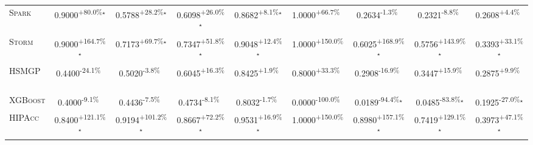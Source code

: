 \begin{table}[htbp]
\begin{tabular}{l|cccc|cccc}
\textsc{Spark} & \cellcolor{green!30}0.9000\textsuperscript{+80.0\%}$^\star$ & \cellcolor{green!30}0.5788\textsuperscript{+28.2\%}$^\star$ & \cellcolor{green!30}0.6098\textsuperscript{+26.0\%}$^\star$ & \cellcolor{green!30}0.8682\textsuperscript{+8.1\%}$^\star$ & \cellcolor{green!30}1.0000\textsuperscript{+66.7\%}$^{\,\,\,}$ & \cellcolor{red!30}0.2634\textsuperscript{-1.3\%}$^{\,\,\,}$ & \cellcolor{red!30}0.2321\textsuperscript{-8.8\%}$^{\,\,\,}$ & \cellcolor{green!30}0.2608\textsuperscript{+4.4\%}$^{\,\,\,}$ \\
\textsc{Storm} & \cellcolor{green!30}0.9000\textsuperscript{+164.7\%}$^\star$ & \cellcolor{green!30}0.7173\textsuperscript{+69.7\%}$^\star$ & \cellcolor{green!30}0.7347\textsuperscript{+51.8\%}$^\star$ & \cellcolor{green!30}0.9048\textsuperscript{+12.4\%}$^\star$ & \cellcolor{green!30}1.0000\textsuperscript{+150.0\%}$^{\,\,\,}$ & \cellcolor{green!30}0.6025\textsuperscript{+168.9\%}$^\star$ & \cellcolor{green!30}0.5756\textsuperscript{+143.9\%}$^\star$ & \cellcolor{green!30}0.3393\textsuperscript{+33.1\%}$^\star$ \\
\textsc{HSMGP} & \cellcolor{red!30}0.4400\textsuperscript{-24.1\%}$^{\,\,\,}$ & \cellcolor{red!30}0.5020\textsuperscript{-3.8\%}$^{\,\,\,}$ & \cellcolor{green!30}0.6045\textsuperscript{+16.3\%}$^{\,\,\,}$ & \cellcolor{green!30}0.8425\textsuperscript{+1.9\%}$^{\,\,\,}$ & \cellcolor{green!30}0.8000\textsuperscript{+33.3\%}$^{\,\,\,}$ & \cellcolor{red!30}0.2908\textsuperscript{-16.9\%}$^{\,\,\,}$ & \cellcolor{green!30}0.3447\textsuperscript{+15.9\%}$^{\,\,\,}$ & \cellcolor{green!30}0.2875\textsuperscript{+9.9\%}$^{\,\,\,}$ \\
\textsc{XGBoost} & \cellcolor{red!30}0.4000\textsuperscript{-9.1\%}$^{\,\,\,}$ & \cellcolor{red!30}0.4436\textsuperscript{-7.5\%}$^{\,\,\,}$ & \cellcolor{red!30}0.4734\textsuperscript{-8.1\%}$^{\,\,\,}$ & \cellcolor{red!30}0.8032\textsuperscript{-1.7\%}$^{\,\,\,}$ & \cellcolor{red!30}0.0000\textsuperscript{-100.0\%}$^{\,\,\,}$ & \cellcolor{red!30}0.0189\textsuperscript{-94.4\%}$^\star$ & \cellcolor{red!30}0.0485\textsuperscript{-83.8\%}$^\star$ & \cellcolor{red!30}0.1925\textsuperscript{-27.0\%}$^\star$ \\
\textsc{HIPAcc} & \cellcolor{green!30}0.8400\textsuperscript{+121.1\%}$^\star$ & \cellcolor{green!30}0.9194\textsuperscript{+101.2\%}$^\star$ & \cellcolor{green!30}0.8667\textsuperscript{+72.2\%}$^\star$ & \cellcolor{green!30}0.9531\textsuperscript{+16.9\%}$^\star$ & \cellcolor{green!30}1.0000\textsuperscript{+150.0\%}$^{\,\,\,}$ & \cellcolor{green!30}0.8980\textsuperscript{+157.1\%}$^\star$ & \cellcolor{green!30}0.7419\textsuperscript{+129.1\%}$^\star$ & \cellcolor{green!30}0.3973\textsuperscript{+47.1\%}$^\star$ \\

\end{tabular}
\end{table}
